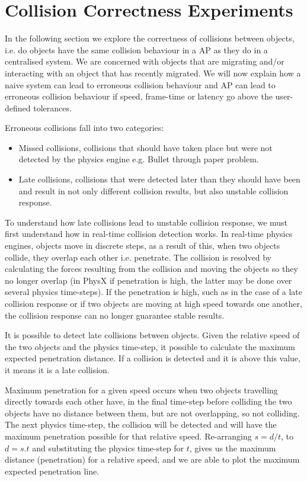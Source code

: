 \section{Collision Correctness Experiments}
In the following section we explore the correctness of collisions between objects, i.e. do objects have the same collision behaviour in a AP as they do in a centralised system. We are concerned with objects that are migrating and/or interacting with an object that has recently migrated.
We will now explain how a naive system can lead to erroneous collision behaviour and AP can lead to erroneous collision behaviour if speed, frame-time or latency go above the user-defined tolerances.

Erroneous collisions fall into two categories:
\begin{itemize}
	\item Missed collisions, collisions that should have taken place but were not detected by the physics engine e.g. Bullet through paper problem.
	\item Late collisions, collisions that were detected later than they should have been and result in not only different collision results, but also unstable collision response.
\end{itemize} 


To understand how late collisions lead to unstable collision response, we must first understand how in real-time collision detection works. In real-time physics engines, objects move in discrete steps, as a result of this, when two objects collide, they overlap each other i.e. penetrate. The collision is resolved by calculating the forces resulting from the collision and moving the objects so they no longer overlap (in PhysX if penetration is high, the latter may be done over several physics time-steps). If the penetration is high, such as in the case of a late collision response or if two objects are moving at high speed towards one another, the collision response can no longer guarantee stable results.

It is possible to detect late collisions between objects. Given the relative speed of the two objects and the physics time-step, it possible to calculate the maximum expected penetration distance. If a collision is detected and it is above this value, it means it is a late collision.

Maximum penetration for a given speed occurs when two objects travelling directly towards each other have, in the final time-step before colliding the two objects have no distance between them, but are not overlapping, so not colliding. The next physics time-step, the collision will be detected and will have the maximum penetration possible for that relative speed. Re-arranging $s=d/t$, to $d=s.t$ and substituting the physics time-step for $t$, gives us the maximum distance (penetration) for a relative speed, and we are able to plot the maximum expected penetration line.


